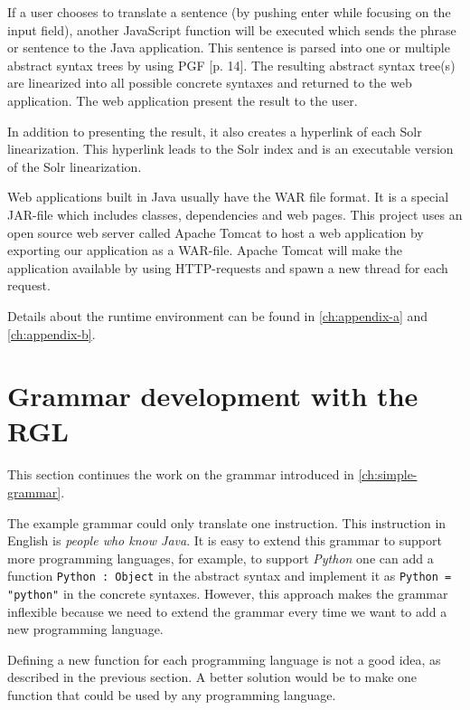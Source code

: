 If a user chooses to translate a sentence (by pushing enter while focusing on the input field), another JavaScript function will be executed which sends the phrase or sentence to the Java application. This sentence is parsed into one or multiple abstract syntax trees by using PGF \cite{angelov:2011}[p. 14]. The resulting abstract syntax tree(s) are linearized into all possible concrete syntaxes and returned to the web application. The web application present the result to the user. 

In addition to presenting the result, it also creates a hyperlink of each Solr linearization. This hyperlink leads to the Solr index and is an executable version of the Solr linearization.

Web applications built in Java usually have the WAR file format. It is a special JAR-file which includes classes, dependencies and web pages. This project uses an open source web server called Apache Tomcat \cite{tomcat} to host a web application by exporting our application as a WAR-file. Apache Tomcat will make the application available by using HTTP-requests and spawn a new thread for each request.

Details about the runtime environment can be found in \autoref{ch:appendix-a} and \autoref{ch:appendix-b}.

\section{Grammar development with the RGL}
This section continues the work on the grammar introduced in \autoref{ch:simple-grammar}.

The example grammar could only translate one instruction. This instruction in English is \emph{people who know Java}. It is easy to extend this grammar to support more programming languages, for example, to support \emph{Python} one can add a function \texttt{Python : Object} in the abstract syntax and implement it as \texttt{Python = "python"} in the concrete syntaxes. However, this approach makes the grammar inflexible because we need to extend the grammar every time we want to add a new programming language.

Defining a new function for each programming language is not a good idea, as described in the previous section. A better solution would be to make one function that could be used by any programming language.


